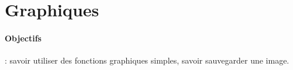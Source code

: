 \section{Graphiques}
\paragraph{Objectifs}: savoir utiliser des fonctions graphiques simples, savoir sauvegarder une image.


